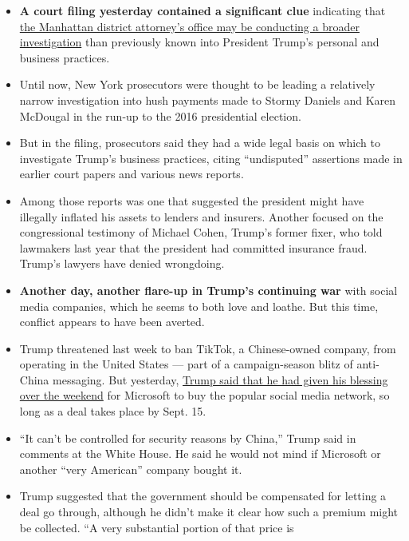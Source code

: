 \begin{itemize}
\item
  \textbf{A court filing yesterday contained a significant clue}
  indicating that
  \href{https://www.nytimes.com/2020/08/03/nyregion/donald-trump-taxes-cyrus-vance.html?action=click\&module=Top\%20Stories\&pgtype=Homepage}{the
  Manhattan district attorney's office may be conducting a broader
  investigation} than previously known into President Trump's personal
  and business practices.
\item
  Until now, New York prosecutors were thought to be leading a
  relatively narrow investigation into hush payments made to Stormy
  Daniels and Karen McDougal in the run-up to the 2016 presidential
  election.
\item
  But in the filing, prosecutors said they had a wide legal basis on
  which to investigate Trump's business practices, citing ``undisputed''
  assertions made in earlier court papers and various news reports.
\item
  Among those reports was one that suggested the president might have
  illegally inflated his assets to lenders and insurers. Another focused
  on the congressional testimony of Michael Cohen, Trump's former fixer,
  who told lawmakers last year that the president had committed
  insurance fraud. Trump's lawyers have denied wrongdoing.
\item
  \textbf{Another day, another flare-up in Trump's continuing war} with
  social media companies, which he seems to both love and loathe. But
  this time, conflict appears to have been averted.
\item
  Trump threatened last week to ban TikTok, a Chinese-owned company,
  from operating in the United States --- part of a campaign-season
  blitz of anti-China messaging. But yesterday,
  \href{https://www.nytimes.com/2020/08/03/technology/trump-tiktok-microsoft.html}{Trump
  said that he had given his blessing over the weekend} for Microsoft to
  buy the popular social media network, so long as a deal takes place by
  Sept. 15.
\item
  ``It can't be controlled for security reasons by China,'' Trump said
  in comments at the White House. He said he would not mind if Microsoft
  or another ``very American'' company bought it.
\item
  Trump suggested that the government should be compensated for letting
  a deal go through, although he didn't make it clear how such a premium
  might be collected. ``A very substantial portion of that price is

\end{itemize}
